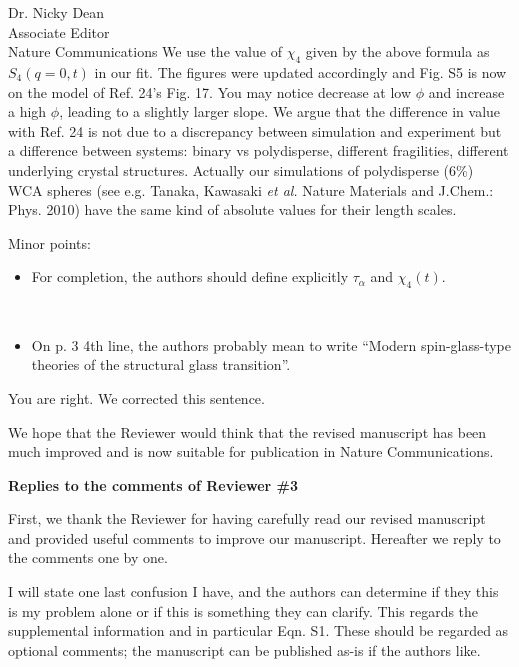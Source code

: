 \documentclass[a4paper, rebuttal, parskip=true, firsthead=false, fromemail=true, foldmarks=false]{scrlttr2}
\begin{document}
\begin{letter}{Dr. Nicky Dean\\
Associate Editor\\
Nature Communications}
We use the value of $\chi_4$ given by the above formula as $S_4(q=0,t)$ in our fit. The figures were updated accordingly and Fig. S5 is now on the model of Ref. 24's Fig. 17. You may notice decrease at low $\phi$ and increase a high $\phi$, leading to a slightly larger slope. We argue that the difference in value with Ref. 24 is not due to a discrepancy between simulation and experiment but a difference between systems: binary vs polydisperse, different fragilities, different underlying crystal structures. Actually our simulations of polydisperse ($6\%$) WCA spheres (see e.g. Tanaka, Kawasaki \emph{et al.} Nature Materials and J.Chem.: Phys. 2010) have the same kind of absolute values for their length scales.

\begin{quotationi}
Minor points:
\begin{itemize}
\item For completion, the authors should define explicitly $\tau_\alpha$ and $\chi_4(t)$.
\end{itemize}
\end{quotationi}

\begin{quotationi}
~
\begin{itemize}
\item On p. 3 4th line, the authors probably mean to write ``Modern spin-glass-type theories of the structural glass transition''.
\end{itemize}
\end{quotationi}
You are right. We corrected this sentence.

We hope that the Reviewer would think that the revised manuscript has been much improved and is now suitable for publication in Nature Communications. 
 
\clearpage

\textsf{\textbf{Replies to the comments of Reviewer \#3}}

First, we thank the Reviewer for having carefully read our revised manuscript and provided useful comments to improve our manuscript. Hereafter we reply to the comments one by one. 

\begin{quotationi}
I will state one last confusion I have, and the authors can determine if they this is my problem alone or if this is something they can clarify. This regards the supplemental information and in particular Eqn. S1. These should be regarded as optional comments; the manuscript can be published as-is if the authors like.


\end{quotationi}
\end{letter}
\end{document}
